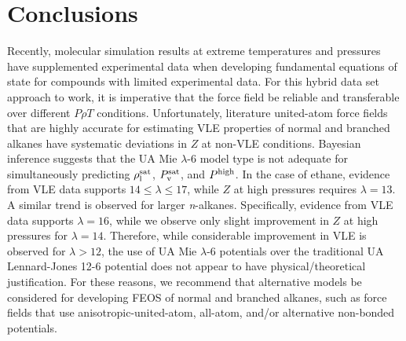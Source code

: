 \documentclass[preprint,letterpaper,floatfix,citeautoscript,aip,jcp]{revtex4-1}
\begin{document}
 
\section{Conclusions} \label{Conclusions}

Recently, molecular simulation results at extreme temperatures and pressures have supplemented experimental data when developing fundamental equations of state for compounds with limited experimental data. For this hybrid data set approach to work, it is imperative that the force field be reliable and transferable over different $P \rho T$ conditions. Unfortunately, literature united-atom force fields that are highly accurate for estimating VLE properties of normal and branched alkanes have systematic deviations in $Z$ at non-VLE conditions. Bayesian inference suggests that the UA Mie $\lambda$-6 model type is not adequate for simultaneously predicting $\rho_{\rm l}^{\rm sat}$, $P_{\rm v}^{\rm sat}$, and $P^{\rm high}$. In the case of ethane, evidence from VLE data supports $14 \le \lambda \le 17$, while $Z$ at high pressures requires $\lambda = 13$. A similar trend is observed for larger \textit{n}-alkanes. Specifically, evidence from VLE data supports $\lambda = 16$, while we observe only slight improvement in $Z$ at high pressures for $\lambda = 14$. Therefore, while considerable improvement in VLE is observed for $\lambda > 12$, the use of UA Mie $\lambda$-6 potentials over the traditional UA Lennard-Jones 12-6 potential does not appear to have physical/theoretical justification. 
%
For these reasons, we recommend that alternative models be considered for developing FEOS of normal and branched alkanes, such as force fields that use anisotropic-united-atom, all-atom, and/or alternative non-bonded potentials.
\end{document}
